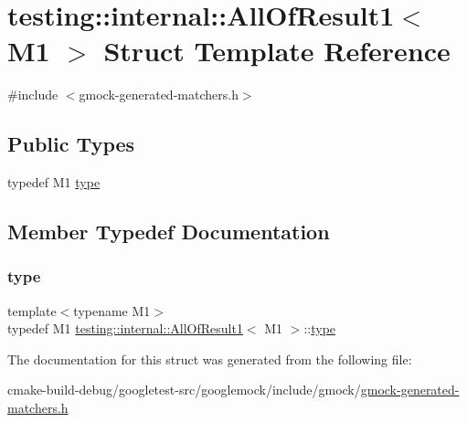 \hypertarget{structtesting_1_1internal_1_1AllOfResult1}{}\section{testing\+::internal\+::All\+Of\+Result1$<$ M1 $>$ Struct Template Reference}
\label{structtesting_1_1internal_1_1AllOfResult1}


{\ttfamily \#include $<$gmock-\/generated-\/matchers.\+h$>$}

\subsection*{Public Types}
\begin{DoxyCompactItemize}
\item 
typedef M1 \mbox{\hyperlink{structtesting_1_1internal_1_1AllOfResult1_a19b95d4ddf7f4044a78665d9e253db10}{type}}
\end{DoxyCompactItemize}


\subsection{Member Typedef Documentation}
\mbox{\label{structtesting_1_1internal_1_1AllOfResult1_a19b95d4ddf7f4044a78665d9e253db10}} 
\subsubsection{\texorpdfstring{type}{type}}
{\footnotesize\ttfamily template$<$typename M1$>$ \\
typedef M1 \mbox{\hyperlink{structtesting_1_1internal_1_1AllOfResult1}{testing\+::internal\+::\+All\+Of\+Result1}}$<$ M1 $>$\+::\mbox{\hyperlink{structtesting_1_1internal_1_1AllOfResult1_a19b95d4ddf7f4044a78665d9e253db10}{type}}}



The documentation for this struct was generated from the following file\+:\begin{DoxyCompactItemize}
\item 
cmake-\/build-\/debug/googletest-\/src/googlemock/include/gmock/\mbox{\hyperlink{gmock-generated-matchers_8h}{gmock-\/generated-\/matchers.\+h}}\end{DoxyCompactItemize}
